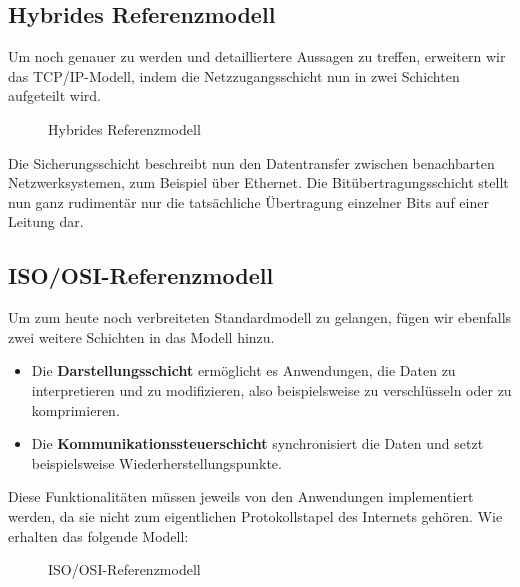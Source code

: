 \documentclass[11pt,a4paper]{scrartcl}
\begin{document}
\subsection{Hybrides Referenzmodell}
Um noch genauer zu werden und detailliertere Aussagen zu treffen, erweitern wir das TCP/IP-Modell, indem die Netzzugangsschicht nun in zwei Schichten aufgeteilt wird.
\begin{figure}[h]
\centering
{}
\caption{Hybrides Referenzmodell}
\end{figure}
Die Sicherungsschicht beschreibt nun den Datentransfer zwischen benachbarten Netzwerksystemen, zum Beispiel über Ethernet. Die Bitübertragungsschicht stellt nun ganz rudimentär nur die tatsächliche Übertragung einzelner Bits auf einer Leitung dar.
\subsection{ISO/OSI-Referenzmodell}
Um zum heute noch verbreiteten Standardmodell zu gelangen, fügen wir ebenfalls zwei weitere Schichten in das Modell hinzu.
\begin{itemize}
\item Die \textbf{Darstellungsschicht} ermöglicht es Anwendungen, die Daten zu interpretieren und zu modifizieren, also beispielsweise zu verschlüsseln oder zu komprimieren.
\item Die \textbf{Kommunikationssteuerschicht} synchronisiert die Daten und setzt beispielsweise Wiederherstellungspunkte.
\end{itemize}
Diese Funktionalitäten müssen jeweils von den Anwendungen implementiert werden, da sie nicht zum eigentlichen Protokollstapel des Internets gehören.
Wie erhalten das folgende Modell:
\begin{figure}[h]
\centering
{}
\caption{ISO/OSI-Referenzmodell}
\end{figure}
\end{document}
